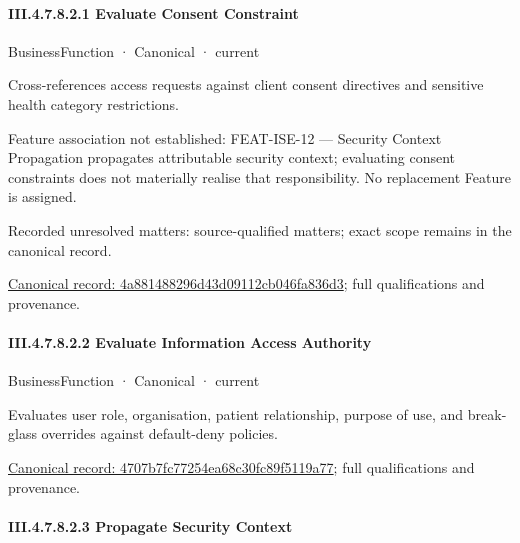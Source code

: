 \paragraph*{III.4.7.8.2.1 Evaluate Consent Constraint}
\label{navigation:III.4.7.8.2.1}

\label{element:4a881488296d43d09112cb046fa836d3}
{\small BusinessFunction · Canonical · current}\par

Cross-references access requests against client consent directives and sensitive health category restrictions.



Feature association not established: FEAT-ISE-12 — Security Context Propagation propagates attributable security context; evaluating consent constraints does not materially realise that responsibility. No replacement Feature is assigned.


{\small Recorded unresolved matters: source-qualified matters; exact scope remains in the canonical record.}\par
{\footnotesize \href{../../../../../../../continuum/business/business-function/4a881488296d43d09112cb046fa836d3.md}{Canonical record: 4a881488296d43d09112cb046fa836d3}; full qualifications and provenance.}\par
\paragraph*{III.4.7.8.2.2 Evaluate Information Access Authority}
\label{navigation:III.4.7.8.2.2}

\label{element:4707b7fc77254ea68c30fc89f5119a77}
{\small BusinessFunction · Canonical · current}\par

Evaluates user role, organisation, patient relationship, purpose of use, and break-glass overrides against default-deny policies.


{\footnotesize \href{../../../../../../../continuum/business/business-function/4707b7fc77254ea68c30fc89f5119a77.md}{Canonical record: 4707b7fc77254ea68c30fc89f5119a77}; full qualifications and provenance.}\par
\paragraph*{III.4.7.8.2.3 Propagate Security Context}
\label{navigation:III.4.7.8.2.3}

